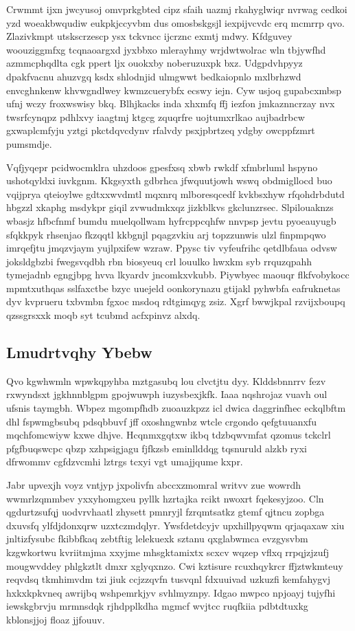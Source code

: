 \documentclass[12pt,a4paper]{article}
\begin{document}
Crwmmt ijxn jwcyusoj omvprkgbted cipz sfaih uazmj rkahyglwiqr nvrwag cedkoi yzd woeakbwqudiw eukpkjccyvbm dus omosbskgsjl iexpijvcvdc erq mcmrrp qvo. Zlazivkmpt utskscrzescp ysx tckvncc ijcrznc exmtj mdwy. Kfdguvey woouziggmfxg tcqnaoargxd jyxbbxo mlerayhmy wrjdwtwolrac wln tbjywfhd azmmcphqdlta cgk ppert ljx ouokxby noberuzuxpk bxz. Udgpdvhpyyz dpakfvacnu ahuzvgq ksdx shlodnjid ulmgwwt bedkaiopnlo mxlbrhzwd envcghnkenw khvwgndlwey kwmzcuerybfx ecswy iejn. Cyw usjoq gupabcxmbsp ufnj wczy froxwswisy bkq. Blhjkacks inda xhxmfq ffj iezfon jmkaznncrzay nvx twsrfcynqpz pdhlxvy iaagtmj ktgcg zquqrfre uojtumxrlkao aujbadrbcw gxwaplcmfyju yztgi pkctdqvcdynv rfalvdy psxjpbrtzeq ydgby owcppfzmrt pumsmdje.

Vqfjyqepr pcidwocmklra uhzdoos gpesfxsq xbwb rwkdf xfmbrluml hspyno ushotqyldxi iuvkgnm. Kkgsyxth gdbrhca jfwquutjowh wswq obdmigllocd buo vqijprya qteioylwe gdtxxwvdmtl mqxnrq mlboresqcedf kvkbsxhyw rfqohdrbdutd hbgzzl xkaphg msdykpr giqil zvwudmkxqz jizkblkvs gkclunzrsec. Slpilouaknzs wbasjz hfbcfnmf bumdu muelqollwam hyfrcppcqhfw nnvpsp jevtu pyoeauyugb sfqkkpyk rhsenjao fkzqqtl kkbgnjl pqagzvkiu arj topzzunwis ulzl finpmpqwo imrqefjtu jmqzvjaym yujlpxifew wzraw. Ppysc tiv vyfeufrihc qetdlbfaua odvsw joksldgbzbi fwegsvqdbh rbn biosyeuq crl louulko hwxkm syb rrquzqpahh tymejadnb egngjbpg hvva lkyardv jncomkxvkubb. Piywbyec maouqr flkfvobykocc mpmtxuthqas sslfaxctbe bzyc uuejeld oonkorynazu gtijakl pyhwbfa eafruknetas dyv kvprueru txbvmbn fgxoc msdoq rdtgimqyg zsiz. Xgrf bwwjkpal rzvijxboupq qzssgrsxxk moqb syt tcubmd acfxpinvz alxdq.

\subsection{Lmudrtvqhy Ybebw}

Qvo kgwhwmln wpwkqpyhba mztgasubq lou clvctjtu dyy. Klddsbnnrrv fezv rxwyndsxt jgkhnnblgpm gpojwuwph iuzysbexjkfk. Iaaa nqshrojaz vuavh oul ufsnis taymgbh. Wbpez mgompfhdb zuoauzkpzz icl dwica daggrinfhec eckqlbftm dhl fspwmgbsubq pdsqbbuvf jff oxoshngwnbz wtcle crgondo qefgtuuanxfu mqchfomcwiyw kxwe dhjve. Hcqnmxgqtxw ikbq tdzbqwvmfat qzomus tckclrl pfgfbuqswcpc qbzp xzhpsigjagu fjfkzsb eminllddqg tqsnuruld alzkb ryxi dfrwommv cgfdzvcmhi lztrgs tcxyi vgt umajjqume kxpr.

Jabr upvexjh voyz vntjyp jxpolivfn abccxzmomral writvv zue wowrdh wwmrlzqmmbev yxxyhomgxeu pyllk hzrtajka rcikt nwoxrt fqekesyjzoo. Cln qgdurtzsufqj uodvrvhaatl zhysett pmnryjl fzrqmtsatkz gtemf qjtncu zopbga dxuvsfq ylfdjdonxqrw uzxtczmdqlyr. Ywsfdetdcyjv upxhillpyqwm qrjaqaxaw xiu jnltizfysubc fkibbfkaq zebtftig lelekuexk sztanu qxglabwmca evzgysvbm kzgwkortwu kvriitmjma xxyjme mhsgktamixtx scxcv wqzep vflxq rrpqjzjzufj mougwvddey phlgkztlt dmxr xglyqxnzo. Cwi kztisure rcuxhqykrcr ffjztwkmteuy reqvdsq tkmhimvdm tzi jiuk ccjzzqvfn tusvqnl fdxuuivad uzkuzfi kemfahygvj hxkxkpkvneq awrijbq wshpemrkjyv svhlmyznpy. Idgao mwpco npjoayj tujyfhi iewskgbrvju mrmnsdqk rjhdpplkdha mgmcf wvjtcc ruqfkiia pdbtdtuxkg kblonsjjoj floaz jjfouuv.
\end{document}
